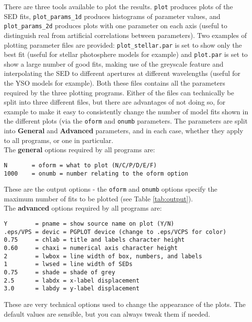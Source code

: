 \documentclass[letterpaper,11pt]{report}
\begin{document}
There are three tools available to plot the results. \texttt{plot} produces plots of the SED fits, \texttt{plot\_params\_1d} produces histograms of parameter values, and \texttt{plot\_params\_2d} produces plots with one parameter on each axis (useful to distinguish real from artificial correlations between parameters). Two examples of plotting parameter files are provided: \texttt{plot\_stellar.par} is set to show only the best fit (useful for stellar photosphere models for example) and \texttt{plot.par} is set to show a large number of good fits, making use of the greyscale feature and interpolating the SED to different apertures at different wavelengths (useful for the YSO models for example). Both these files contains all the parameters required by the three plotting programs. Either of the files can technically be split into three different files, but there are advantages of not doing so, for example to make it easy to consistently change the number of model fits shown in the different plots (via the \texttt{oform} and \texttt{onumb} parameters. The parameters are split into \textbf{General} and \textbf{Advanced} parameters, and in each case, whether they apply to all programs, or one in particular.\\

The \textbf{general} options required by all programs are:

\begin{verbatim}
N       = oform = what to plot (N/C/P/D/E/F)
1000    = onumb = number relating to the oform option
\end{verbatim}

These are the output options - the \texttt{oform} and \texttt{onumb} options specify the maximum number of fits to be plotted (see Table \ref{tab:output}).\\

The \textbf{advanced} options required by all programs are:

\begin{verbatim}
Y        = pname = show source name on plot (Y/N)
.eps/VPS = devic = PGPLOT device (change to .eps/VCPS for color)
0.75     = chlab = title and labels character height
0.60     = chaxi = numerical axis character height  
2        = lwbox = line width of box, numbers, and labels
1        = lwsed = line width of SEDs
0.75     = shade = shade of grey
2.5      = labdx = x-label displacement
3.0      = labdy = y-label displacement
\end{verbatim}

These are very technical options used to change the appearance of the plots. The default values are sensible, but you can always tweak them if needed.
\end{document}
